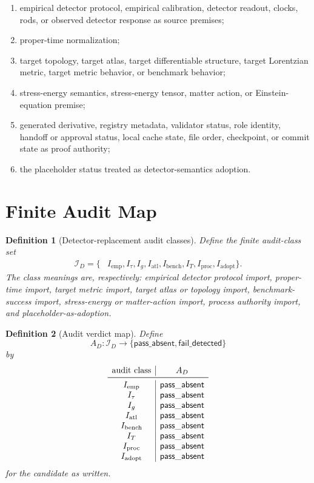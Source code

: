 \documentclass[11pt]{article}
\newcommand{\PassAbsent}{\mathsf{pass\_absent}}
\newcommand{\FailDetected}{\mathsf{fail\_detected}}
\newcommand{\AuditSet}{\mathcal{I}_{D}}
\newcommand{\AuditMap}{A_{D}}
\newtheorem{definition}{Definition}
\begin{document}
\begin{enumerate}[label=(\arabic*)]
  \item empirical detector protocol, empirical calibration, detector readout,
        clocks, rods, or observed detector response as source premises;
  \item proper-time normalization;
  \item target topology, target atlas, target differentiable structure,
        target Lorentzian metric, target metric behavior, or benchmark
        behavior;
  \item stress-energy semantics, stress-energy tensor, matter action, or
        Einstein-equation premise;
  \item generated derivative, registry metadata, validator status, role
        identity, handoff or approval status, local cache state, file order,
        checkpoint, or commit state as proof authority;
  \item the placeholder status treated as detector-semantics adoption.
\end{enumerate}

\section{Finite Audit Map}

\begin{definition}[Detector-replacement audit classes]
Define the finite audit-class set
\[
\begin{aligned}
  \AuditSet=\{&
  I_{\mathrm{emp}}, I_{\tau}, I_{g}, I_{\mathrm{atl}},
  I_{\mathrm{bench}}, I_{T}, I_{\mathrm{proc}}, I_{\mathrm{adopt}}\}.
\end{aligned}
\]
The class meanings are, respectively: empirical detector protocol import,
proper-time import, target metric import, target atlas or topology import,
benchmark-success import, stress-energy or matter-action import, process
authority import, and placeholder-as-adoption.
\end{definition}

\begin{definition}[Audit verdict map]
Define
\[
  \AuditMap:\AuditSet\to\{\PassAbsent,\FailDetected\}
\]
by
\[
\begin{array}{c|c}
\text{audit class} & \AuditMap \\
\midrule
I_{\mathrm{emp}} & \PassAbsent\\
I_{\tau} & \PassAbsent\\
I_{g} & \PassAbsent\\
I_{\mathrm{atl}} & \PassAbsent\\
I_{\mathrm{bench}} & \PassAbsent\\
I_{T} & \PassAbsent\\
I_{\mathrm{proc}} & \PassAbsent\\
I_{\mathrm{adopt}} & \PassAbsent
\end{array}
\]
for the candidate as written.
\end{definition}
\end{document}
